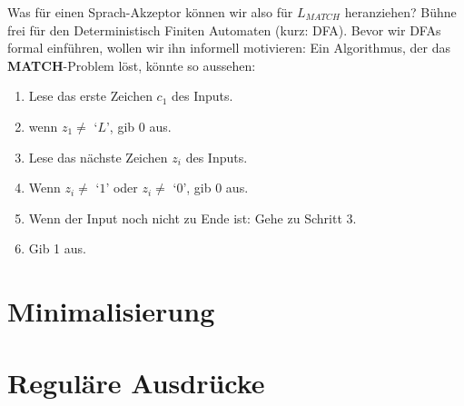 Was für einen Sprach-Akzeptor können wir also für $L_{MATCH}$ heranziehen?
Bühne frei für den Deterministisch Finiten Automaten (kurz: DFA).
Bevor wir DFAs formal einführen, wollen wir ihn informell motivieren: 
Ein Algorithmus, der das \textbf{MATCH}-Problem löst, könnte so aussehen:
\begin{enumerate}
    \item Lese das erste Zeichen $c_1$ des Inputs.
    \item wenn $z_1 \neq $ `$L$', gib 0 aus.
    \item Lese das nächste Zeichen $z_i$ des Inputs.
    \item Wenn $z_i \neq $ `$1$' oder $z_i \neq $ `$0$', gib 0 aus.
    \item Wenn der Input noch nicht zu Ende ist: Gehe zu Schritt 3.
    \item Gib 1 aus.
\end{enumerate}


\section{Minimalisierung}
\section{Reguläre Ausdrücke}


